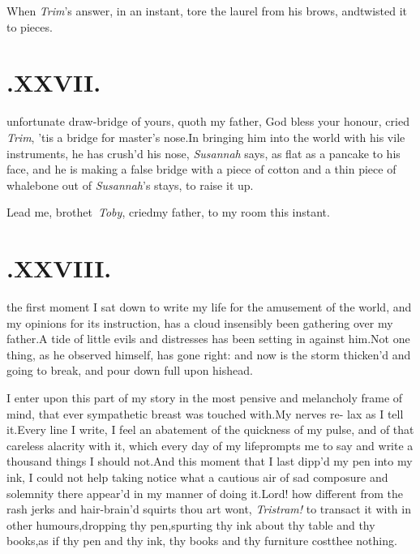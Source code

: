 \documentclass{article}
\begin{document}
When \textit{Trim}’s answer, in an instant, tore the laurel from
his brows, and\break twisted it to pieces.


\section{.\quad  XXVII.}

 unfortunate draw-bridge\break
of yours, quoth my father,\tsk\break
God bless your honour, cried \textit{Trim}, ’tis a bridge for
master’s nose.\tsh In bring\-ing him into the world with his vile
instruments, he has crush’d his nose, \textit{Su\-sannah} says, as
flat as a pancake to his face, and he is making a false bridge
with a piece of cotton and a thin piece of whalebone out of
\textit{Susannah}’s stays, to raise it up.

\tsh Lead me, brothet\sic\ \textit{Toby}, cried\break my father, to
my room this instant.

\baselineskip
{}\newpage

\section{.\quad  XXVIII.}

 the first moment I sat down\break
to write my life for the amusement of the world, and my opinions
for its instruction, has a cloud insensibly been gathering over
my father.\tsh A tide of little evils and distresses has been
setting in against him.\tsk Not one thing, as he observed
himself, has gone right: and now is the storm thicken’d and
going to break, and pour down full upon his\break head.

I enter upon this part of my story in the most pensive and
melancholy frame of mind, that ever sympathetic breast\break
was touched with.\tsh My nerves re-\break
lax as I tell it.\tsh Every line I write,\break
I feel an abatement of the quickness of
my pulse, and of that careless alacrity with it, which every day
of my life\break prompts me to say and write a thousand things I
should not.\tsh And this moment that I last dipp’d my pen into
my ink, I could not help taking notice what a cautious air of
sad composure and solemnity there appear’d in my manner of doing
it.\tsh Lord! how different from the rash jerks and hair-brain’d
squirts thou art wont, \textit{Tristram!} to transact it with in
other humours,\tsk dropping thy pen,\tsk spurting thy ink about
thy table and thy books,\tsh as if thy pen and thy ink, thy
books and thy furniture cost\break thee nothing.
\end{document}
